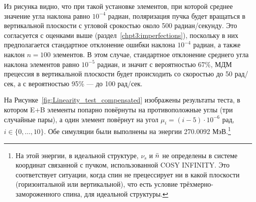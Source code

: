 Из рисунка видно, что при такой установке элементов, при которой среднее значение угла наклона равно $10^{-4}$ радиан, поляризация пучка будет вращаться в вертикальной плоскости с угловой срокостью около 500 радиан/секунду. Это согласуется с оценками выше (раздел~\ref{chpt3:imperfections}), поскольку в них предполагается стандартное отклонение ошибки наклона $10^{-4}$ радиан, а также наклон $n=100$ элементов. В этом случае, стандартное отклонение среднего угла наклона элементов равно $10^{-5}$ радиан, и значит с вероятностью 67\%, МДМ прецессия в вертикальной плоскости будет происходить со скоростью до 50 рад/сек, а с вероятностью 95\% --- до 100 рад/сек.

На Рисунке~\ref{fig:Linearity_test_compensated} изображены результаты теста, в котором E+B элементы попарно повёрнуты на противоположные углы (три случайные пары), а один элемент повёрнут на угол
$\mu_i = (i-5)\cdot 10^{-6}$ рад, $i\in\lbrace0,\dots,10\rbrace$. Обе симуляции были выполнены на энергии
270.0092 МэВ.\footnote{На этой энергии, в идеальной структуре, $\nu_s$ и $\bar n$
	не определены в системе координат связанной с пучком, использованной
	COSY INFINITY. Это соответствует ситуации, когда спин не прецессирует ни в какой плоскости 
	(горизонтальной или вертикальной), что есть условие трёхмерно-замороженного спина, 
	для идеальной структуры.}


